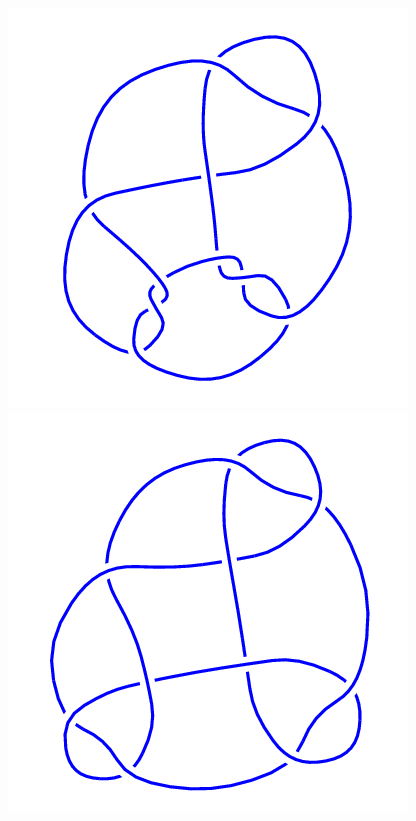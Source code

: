 \begin{figure}[H]
\begin{minipage}[b]{.18\linewidth}
    \end{minipage}
    \begin{minipage}[b]{.18\linewidth}
        \centering
        \includegraphics[width=\linewidth]{../data/10_74.png}
    \end{minipage}
    \begin{minipage}[b]{.18\linewidth}
        \centering
        \includegraphics[width=\linewidth]{../data/10_75.png}

\end{minipage}
\end{figure}

